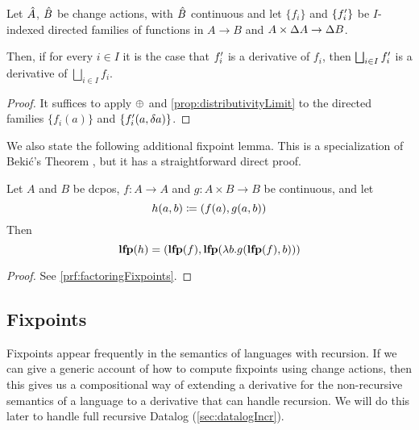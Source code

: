 \begin{corollary}
  \label{cor:diffContinuous}
  Let $\hat{A}$, $\hat{B}$ be change actions, with $\hat{B}$ continuous and let $\{f_i\}$ and $\{f_i'\}$ be
  $I$-indexed directed families of functions in $A \rightarrow B$ and $A \times \Delta A \rightarrow \Delta B$.

  Then, if for every $i \in I$ it is the case that $f_i'$ is a derivative of $f_i$, then $\bigsqcup_{i \in I} f_i'$ is
  a derivative of $\bigsqcup_{i \in I} f_i $.
\end{corollary}
\ifproofs
\begin{proof}
  It suffices to apply $\oplus$ and \cref{prop:distributivityLimit} to the directed families $\{ f_i(a) \}$ and
  $\{ f_i'(a, \delta a) \}$.
\end{proof}
\fi

We also state the following additional fixpoint lemma. This is a specialization of
Beki\'c's Theorem \autocite[][section 10.1]{winskel1993formal}, but it has a straightforward direct proof.

\begin{prop}[name=Factoring of fixpoints, restate=factoringFixpoints]
  \label{prop:factoringFixpoints}
  Let $A$ and $B$ be dcpos, $f : A \rightarrow A$ and $g: A \times B \rightarrow B$ be continuous, and let
  \begin{displaymath}
    h(a, b) \coloneqq (f(a), g(a, b))
  \end{displaymath}
  Then
  \begin{displaymath}
    \mathbf{lfp}(h) = (\mathbf{lfp}(f), \mathbf{lfp}(\lambda b . g(\mathbf{lfp}(f), b)))
  \end{displaymath}
\end{prop}
\ifproofs
\begin{proof}
  See \cref{prf:factoringFixpoints}.
\end{proof}
\fi

\subsection{Fixpoints}
\label{sec:fixpoints}


Fixpoints appear frequently in the semantics of languages with recursion. If we
can give a generic account of how to compute fixpoints using change actions,
then this gives us a compositional way of extending a derivative for the
non-recursive semantics of a language to a derivative that can handle recursion.
We will do this later to handle full recursive Datalog (\cref{sec:datalogIncr}).

